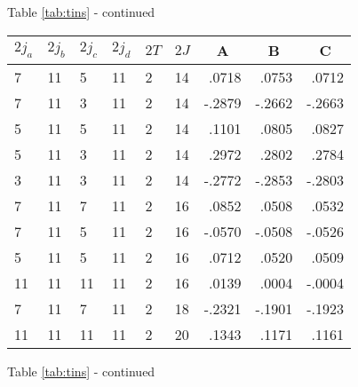 \begin{center}{Table \ref{tab:tins} - continued}\end{center}
\clearpage
\small
\begin{center}
\begin{tabular}{llllllrrr}
\hline
$2j_{a}$&$2j_{b}$&$2j_{c}$&$2j_{d}$&$2T$&$2J$&
\multicolumn{1}{c}{A}&
\multicolumn{1}{c}{B}&
\multicolumn{1}{c}{C}
\\\hline
  7&11& 5&11& 2&14&   .0718&   .0753&   .0712\\
  7&11& 3&11& 2&14&  -.2879&  -.2662&  -.2663\\
  5&11& 5&11& 2&14&   .1101&   .0805&   .0827\\
  5&11& 3&11& 2&14&   .2972&   .2802&   .2784\\
  3&11& 3&11& 2&14&  -.2772&  -.2853&  -.2803\\
  7&11& 7&11& 2&16&   .0852&   .0508&   .0532\\
  7&11& 5&11& 2&16&  -.0570&  -.0508&  -.0526\\
  5&11& 5&11& 2&16&   .0712&   .0520&   .0509\\
 11&11&11&11& 2&16&   .0139&   .0004&  -.0004\\
  7&11& 7&11& 2&18&  -.2321&  -.1901&  -.1923\\
 11&11&11&11& 2&20&   .1343&   .1171&   .1161\\
\hline
\end{tabular}
\end{center}
\begin{center}{Table \ref{tab:tins} - continued}\end{center}





